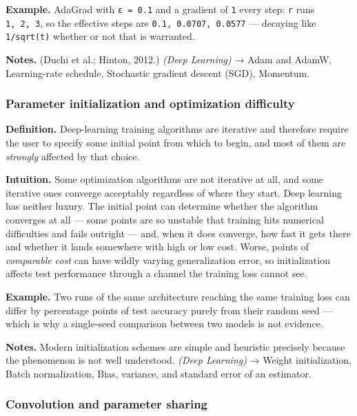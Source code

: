 \documentclass[
  10pt,
  letterpaper,
  onecolumn]{article}
\begin{document}
\textbf{Example.} AdaGrad with \texttt{ε\ =\ 0.1} and a gradient of
\texttt{1} every step: \texttt{r} runs \texttt{1,\ 2,\ 3}, so the
effective steps are \texttt{0.1,\ 0.0707,\ 0.0577} --- decaying like
\texttt{1/sqrt(t)} whether or not that is warranted.

\textbf{Notes.} (Duchi et al.; Hinton, 2012.) \emph{(Deep Learning)} →
Adam and AdamW, Learning-rate schedule, Stochastic gradient descent
(SGD), Momentum.

\hypertarget{parameter-initialization-and-optimization-difficulty}{%
\subsubsection{Parameter initialization and optimization
difficulty}\label{parameter-initialization-and-optimization-difficulty}}

\textbf{Definition.} Deep-learning training algorithms are iterative and
therefore require the user to specify some initial point from which to
begin, and most of them are \emph{strongly} affected by that choice.

\textbf{Intuition.} Some optimization algorithms are not iterative at
all, and some iterative ones converge acceptably regardless of where
they start. Deep learning has neither luxury. The initial point can
determine whether the algorithm converges at all --- some points are so
unstable that training hits numerical difficulties and fails outright
--- and, when it does converge, how fast it gets there and whether it
lands somewhere with high or low cost. Worse, points of \emph{comparable
cost} can have wildly varying generalization error, so initialization
affects test performance through a channel the training loss cannot see.

\textbf{Example.} Two runs of the same architecture reaching the same
training loss can differ by percentage points of test accuracy purely
from their random seed --- which is why a single-seed comparison between
two models is not evidence.

\textbf{Notes.} Modern initialization schemes are simple and heuristic
precisely because the phenomenon is not well understood. \emph{(Deep
Learning)} → Weight initialization, Batch normalization, Bias, variance,
and standard error of an estimator.

\hypertarget{convolution-and-parameter-sharing}{%
\subsubsection{Convolution and parameter
sharing}\label{convolution-and-parameter-sharing}}
\end{document}
